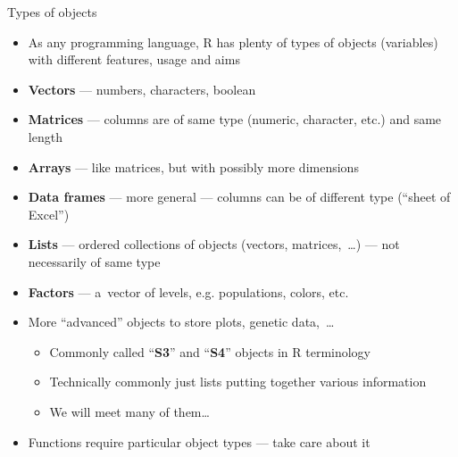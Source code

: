 \documentclass[compress, xelatex, 11pt, xcolor=svgnames, aspectratio=169,
	hyperref={
		bookmarks=true,
		unicode=true,
		colorlinks=true,
		pdftitle={Molecular data in R},
		plainpages=false,
		pdfauthor={Vojtech Zeisek},
		pdfsubject={Course about phylogeny and evolution in R},
		pdfcreator={XeLaTeX},
		pdfkeywords={R, evolution, phylogeny, molecular data},
		linkcolor=Crimson, %
		anchorcolor=Magenta, %
		citecolor=Magenta, %
		filecolor=Magenta, %
		menucolor=Magenta, %
		urlcolor=DodgerBlue, %
		},
	url={hyphens, lowtilde} %
	]{beamer}
\begin{document}
\begin{frame}{Types of objects}
	\begin{itemize}
		\item As any programming language, R has plenty of types of objects (variables) with different features, usage and aims
		\item \textbf{Vectors} --- numbers, characters, boolean
		\item \textbf{Matrices} --- columns are of same type (numeric, character, etc.) and same length
		\item \textbf{Arrays} --- like matrices, but with possibly more dimensions
		\item \textbf{Data frames} --- more general --- columns can be of different type (\enquote{sheet of Excel})
		\item \textbf{Lists} --- ordered collections of objects (vectors, matrices,~\ldots) --- not necessarily of same type
		\item \textbf{Factors} --- a~vector of levels, e.g. populations, colors, etc.
		\item More \enquote{advanced} objects to store plots, genetic data,~\ldots
		\begin{itemize}
			\item Commonly called \enquote{\textbf{S3}} and \enquote{\textbf{S4}} objects in R terminology
			\item Technically commonly just lists putting together various information
			\item We will meet many of them\ldots
		\end{itemize}
	\item Functions require particular object types --- take care about it
	\end{itemize}
\end{frame}
\end{document}
